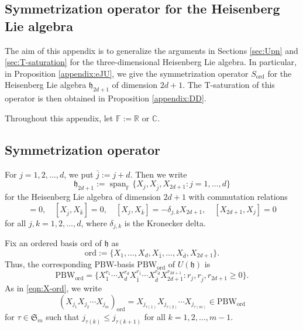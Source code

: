 \documentclass[a4paper,11pt,reqno]{amsart}
\newcommand{\frakh}{\mathfrak{h}}
\newcommand{\0}{{\bf 0}}
\newcommand{\R}{\mathbb{R}}
\newcommand{\C}{\mathbb{C}}
\newcommand{\F}{\mathbb{F}}
\newcommand{\1}{{\bf 1}}
\DeclareMathOperator{\Span}{span}
\newcommand{\ord}{{\mathrm{ord}}}
\theoremstyle{plain}
\theoremstyle{definition}
\numberwithin{equation}{section}
\theoremstyle{definition}
\begin{document}
\begin{appendices}

\section{Symmetrization operator for the Heisenberg Lie algebra}
\label{appendix:Heis}

The aim of this appendix is to generalize the arguments in Sections \ref{sec:Upn} and \ref{sec:T-saturation} for the three-dimensional Heisenberg Lie algebra.
In particular, in Proposition \ref{appendix:eJU}, we give the symmetrization operator $S_{\ord}$ for the Heisenberg Lie algebra $\frakh_{2d+1}$ of dimension $2d+1$. The T-saturation of this operator is then obtained in Proposition \ref{appendix:DD}.

Throughout this appendix, let $\F:=\R$ or $\C$.

\subsection{Symmetrization operator}
\label{appendix:Heis1}

For $j=1,2,\ldots, d$, we put $\bar{j}:=j+d$. Then we write
\begin{equation*}
\frakh_{2d+1}:=\Span_\F\{X_j,X_{\bar{j}}, X_{2d+1}: j=1,\ldots, d\}
\end{equation*}
for the Heisenberg Lie algebra of dimension $2d+1$ 
with commutation relations
\begin{equation*}
[X_j, X_k] = 0,
\quad
[X_{\bar{j}}, X_{\bar{k}}] = 0,
\quad
[X_j, X_{\bar{k}}] = -\delta_{j,k} X_{2d+1},
\quad
[X_{2d+1},X_j]=0
\end{equation*}
for all $j,k=1,2,\ldots, d$, where $\delta_{j,k}$ is the Kronecker delta.

Fix an ordered basis $\ord$ of $\frakh$ as
\begin{equation}\label{eqn:ord-Heisenberg}
\ord:=\{X_1,\ldots, X_d, X_{\bar{1}}, \ldots, X_{\bar{d}}, X_{2d+1}\}.
\end{equation}
Thus, the corresponding PBW-basis $\mathrm{PBW}_\ord$ of 
$U(\frakh)$ is 
\begin{equation*}
\mathrm{PBW}_\ord
=\{X_1^{r_1}\cdots X_d^{r_d}
X_{\bar{1}}^{r_{\bar{1}}}\cdots X_{\bar{d}}^{r_{\bar{d}}} X_{2d+1}^{r_{2d+1}}
: r_j, r_{\bar{j}}, r_{2d+1} \geq 0\}.
\end{equation*}
As in \eqref{eqn:X-ord}, we write
\begin{equation*}
(X_{j_1}X_{j_2}\cdots X_{j_m})_\ord
=
X_{j_{\tau(1)}}X_{j_{\tau(2)}} \cdots X_{j_{\tau(m)}}
\in \mathrm{PBW}_\ord
\end{equation*}
for $\tau \in \mathfrak{S}_m$ such that $j_{\tau(k)} \leq j_{\tau(k+1)}$
for all $k=1,2,\ldots, m-1$.


\end{appendices}
\end{document}
